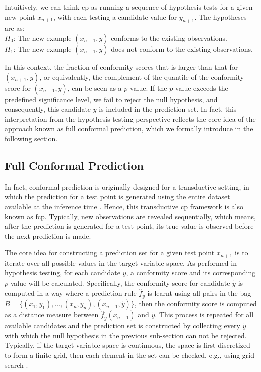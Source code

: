 \documentclass[a4paper,oneside,bibliography=totoc]{scrbook}
\begin{document}
Intuitively, we can think \gls{cp} as running a sequence of hypothesis tests for a given new point $x_{n+1}$, with each testing a candidate value for $y_{n+1}$. The hypotheses are as: \\

\vspace{-0.3em}
\indent $H_0$: The new example $(x_{n+1}, y)$ conforms to the existing observations. \\
\indent	$H_1$: The new example $(x_{n+1}, y)$ does not conform to the existing observations. \\
\vspace{-0.3em}

\noindent In this context, the fraction of conformity scores that is larger than that for $(x_{n+1}, y)$, or equivalently, the complement of the quantile of the conformity score for $(x_{n+1}, y)$, can be seen as a $p$-value. If the $p$-value exceeds the predefined significance level, we fail to reject the null hypothesis, and consequently, this candidate $y$ is included in the prediction set. In fact, this interpretation from the hypothesis testing perspective reflects the core idea of the approach known as full conformal prediction, which we formally introduce in the following section.

\subsection{Full Conformal Prediction}
In fact, conformal prediction is originally designed for a transductive setting, in which the prediction for a test point is generated using the entire dataset available at the inference time \cite{gammerman1998learning}. Hence, this transductive \gls{cp} framework is also known as \gls{fcp}. Typically, new observations are revealed sequentially, which means, after the prediction is generated for a test point, its true value is observed before the next prediction is made. 

The core idea for constructing a prediction set for a given test point $x_{n+1}$ is to iterate over all possible values in the target variable space. As performed in hypothesis testing, for each candidate $y$, a conformity score and its corresponding $p$-value will be calculated. Specifically, the conformity score for candidate $\tilde{y}$ is computed in a way where a prediction rule $\hat{f}_{\tilde{y}}$ is learnt using all pairs in the bag \(B = \{(x_1, y_1), \dots, (x_n, y_n), (x_{n+1}, \tilde{y})\}\), then the conformity score is computed as a distance measure between $\hat{f}_{\tilde{y}}(x_{n+1})$ and $\tilde{y}$. This process is repeated for all available candidates and the prediction set is constructed by collecting every $\tilde{y}$ with which the null hypothesis in the previous sub-section can not be rejected. Typically, if the target variable space is continuous, the space is first discretized to form a finite grid, then each element in the set can be checked, e.g., using grid search \cite{angelopoulos2021gentle}.
\end{document}
